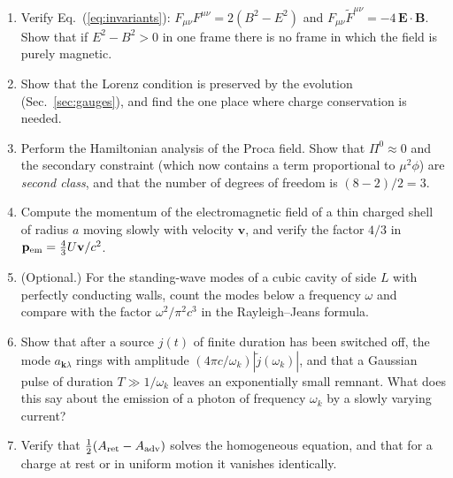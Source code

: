\documentclass[11pt,a4paper]{book}
\begin{document}
\begin{enumerate}
\item Verify Eq.~(\ref{eq:invariants}): $F_{\mu\nu}F^{\mu\nu}=2(B^2-E^2)$ and
$F_{\mu\nu}\tilde F^{\mu\nu}=-4\,\mathbf E\cdot\mathbf B$. Show that if $E^2-B^2>0$ in one frame
there is no frame in which the field is purely magnetic.
\item Show that the Lorenz condition is preserved by the evolution (Sec.~\ref{sec:gauges}), and
find the one place where charge conservation is needed.
\item Perform the Hamiltonian analysis of the Proca field. Show that $\Pi^0\approx0$ and the secondary
constraint (which now contains a term proportional to $\mu^2\phi$) are \emph{second class}, and that the
number of degrees of freedom is $(8-2)/2=3$.
\item Compute the momentum of the electromagnetic field of a thin charged shell of radius $a$
moving slowly with velocity $\mathbf v$, and verify the factor $4/3$ in $\mathbf p_{\rm em}=\tfrac43U\mathbf v/c^2$.
\item (Optional.) For the standing-wave modes of a cubic cavity of side $L$ with perfectly conducting walls, count
the modes below a frequency $\omega$ and compare with the factor $\omega^2/\pi^2c^3$ in the
Rayleigh--Jeans formula.
\item Show that after a source $j(t)$ of finite duration has been switched off, the mode $a_{\mathbf k\lambda}$ rings with
amplitude $(4\pi c/\omega_k)|\tilde j(\omega_k)|$, and that a Gaussian pulse of duration $T\gg1/\omega_k$ leaves an exponentially
small remnant. What does this say about the emission of a photon of frequency $\omega_k$ by a slowly varying current?
\item Verify that $\tfrac12(A_{\rm ret}-A_{\rm adv})$ solves the homogeneous equation, and that for a charge at rest or in
uniform motion it vanishes identically.
\end{enumerate}
\end{document}
